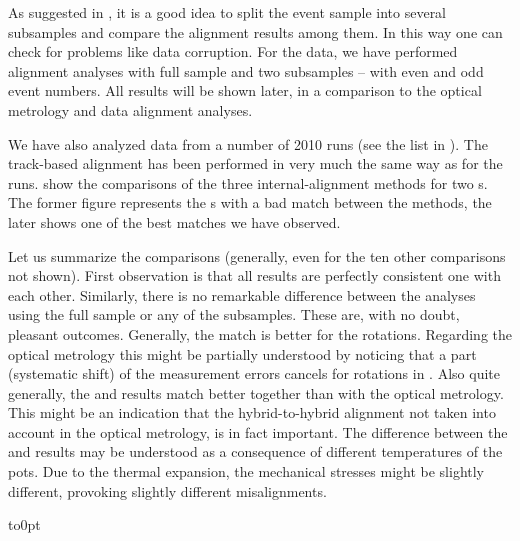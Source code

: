 
As suggested in , it is a good idea to split the event sample into several subsamples and compare the alignment results among them. In this way one can check for problems like data corruption. For the  data, we have performed alignment analyses with full sample and two subsamples -- with even and odd event numbers. All results will be shown later, in a comparison to the optical metrology and  data alignment analyses.


We have also analyzed data from a number of 2010  runs (see the list in ). The track-based alignment has been performed in very much the same way as for the  runs.  show the comparisons of the three internal-alignment methods for two s. The former figure represents the s with a bad match between the methods, the later shows one of the best matches we have observed.

Let us summarize the comparisons (generally, even for the ten other comparisons not shown). First observation is that all  results are perfectly consistent one with each other. Similarly, there is no remarkable difference between the  analyses using the full sample or any of the subsamples. These are, with no doubt, pleasant outcomes. Generally, the match is better for the rotations. Regarding the optical metrology this might be partially understood by noticing that a part (systematic shift) of the measurement errors cancels for rotations in . Also quite generally, the  and  results match better together than with the optical metrology. This might be an indication that the hybrid-to-hybrid alignment not taken into account in the optical metrology, is in fact important. The difference between the  and  results may be understood as a consequence of different temperatures of the pots. Due to the thermal expansion, the mechanical stresses might be slightly different, provoking slightly different misalignments.

\eject
\vbox to0pt{\hbox{}}
\kern-15.5mm
\kern-7mm


